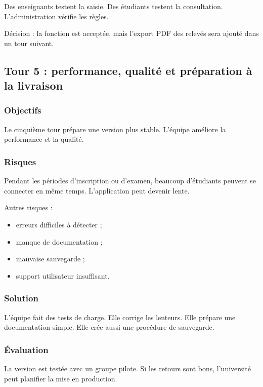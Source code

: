 \documentclass[12pt,a4paper]{article}
\begin{document}
Des enseignants testent la saisie. Des étudiants testent la consultation. L'administration vérifie les règles.

Décision : la fonction est acceptée, mais l'export PDF des relevés sera ajouté dans un tour suivant.

\subsection{Tour 5 : performance, qualité et préparation à la livraison}

\subsubsection{Objectifs}

Le cinquième tour prépare une version plus stable. L'équipe améliore la performance et la qualité.

\subsubsection{Risques}

Pendant les périodes d'inscription ou d'examen, beaucoup d'étudiants peuvent se connecter en même temps. L'application peut devenir lente.

Autres risques :

\begin{itemize}
    \item erreurs difficiles à détecter ;
    \item manque de documentation ;
    \item mauvaise sauvegarde ;
    \item support utilisateur insuffisant.
\end{itemize}

\subsubsection{Solution}

L'équipe fait des tests de charge. Elle corrige les lenteurs. Elle prépare une documentation simple. Elle crée aussi une procédure de sauvegarde.

\subsubsection{Évaluation}

La version est testée avec un groupe pilote. Si les retours sont bons, l'université peut planifier la mise en production.
\end{document}
